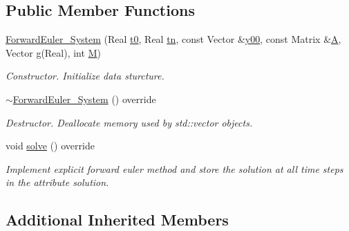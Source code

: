 \subsection*{Public Member Functions}
\begin{DoxyCompactItemize}
\item 
\mbox{\label{class_forward_euler___system_aafa4f24d552bc1224326d4006315bb21}} 
\mbox{\hyperlink{class_forward_euler___system_aafa4f24d552bc1224326d4006315bb21}{Forward\+Euler\+\_\+\+System}} (Real \mbox{\hyperlink{class_o_d_e___system_a1947b357608babc98c5e79d645e24c3c}{t0}}, Real \mbox{\hyperlink{class_o_d_e___system_a5c5a0dd9f04dfb8d8a84d49b741773af}{tn}}, const Vector \&\mbox{\hyperlink{class_o_d_e___system_a1379137a4480e5861fd1911bc061f908}{y00}}, const Matrix \&\mbox{\hyperlink{class_o_d_e___system_a632009677e80b62a1996e842398bf8b6}{A}}, Vector \mbox{\hyperlink{class_o_d_e___system_a2dee2a4b3468547c3ddab15edfc8ddfd}{g}}(Real), int \mbox{\hyperlink{class_o_d_e___system_a46e5ee402ffc7c500dccad753a1fba36}{M}})
\begin{DoxyCompactList}\small\item\em Constructor. Initialize data sturcture. \end{DoxyCompactList}\item 
\mbox{\label{class_forward_euler___system_a97a3dd10d62f962b537ac616e84463a5}} 
\mbox{\hyperlink{class_forward_euler___system_a97a3dd10d62f962b537ac616e84463a5}{$\sim$\+Forward\+Euler\+\_\+\+System}} () override
\begin{DoxyCompactList}\small\item\em Destructor. Deallocate memory used by std\+::vector objects. \end{DoxyCompactList}\item 
void \mbox{\hyperlink{class_forward_euler___system_a336f60f3804df3323a4729f9ff380b65}{solve}} () override
\begin{DoxyCompactList}\small\item\em Implement explicit forward euler method and store the solution at all time steps in the attribute solution. \end{DoxyCompactList}\end{DoxyCompactItemize}
\subsection*{Additional Inherited Members}


